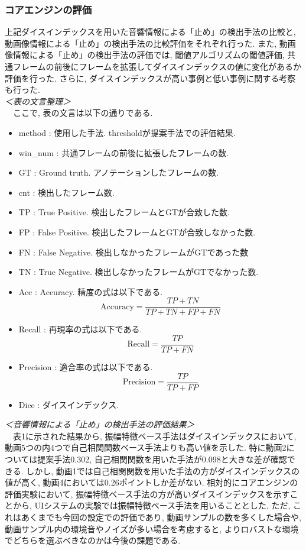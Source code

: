 \documentclass[paper]{ieicej}
\begin{document}
\subsubsection{コアエンジンの評価}
上記ダイスインデックスを用いた音響情報による「止め」の検出手法の比較と, 動画像情報による「止め」の検出手法の比較評価をそれぞれ行った. また, 動画像情報による「止め」の検出手法の評価では, 閾値アルゴリズムの閾値評価, 共通フレームの前後にフレームを拡張してダイスインデックスの値に変化があるか評価を行った. さらに, ダイスインデックスが高い事例と低い事例に関する考察も行った. \\
\textit{＜表の文言整理＞}\\
　ここで, 表の文言は以下の通りである. 
\begin{itemize}[nosep]
  \item method : 使用した手法. thresholdが提案手法での評価結果.
  \item win\_num : 共通フレームの前後に拡張したフレームの数. 
  \item GT : Ground truth. アノテーションしたフレームの数. 
  \item cnt : 検出したフレーム数. 
  \item TP : True Positive. 検出したフレームとGTが合致した数. 
  \item FP : False Positive. 検出したフレームとGTが合致しなかった数. 
  \item FN : False Negative. 検出しなかったフレームがGTであった数
  \item TN : True Negative. 検出しなかったフレームがGTでなかった数. 
  \item Acc : Accuracy. 精度の式は以下である. 
  \begin{equation}
    \text{Accuracy}=\frac{TP + TN}{TP+TN+FP+FN}
  \end{equation}
  \item Recall : 再現率の式は以下である.
  \begin{equation}
    \text{Recall}=\frac{TP}{TP+FN}
  \end{equation}
  \item Precision : 適合率の式は以下である.
  \begin{equation}
    \text{Precision}=\frac{TP}{TP+FP}
  \end{equation}
  \item Dice : ダイスインデックス.
\end{itemize}
\textit{＜音響情報による「止め」の検出手法の評価結果＞}\\
　表1に示された結果から, 振幅特徴ベース手法はダイスインデックスにおいて, 動画5つの内4つで自己相関関数ベース手法よりも高い値を示した. 特に動画2については提案手法0.302, 自己相関関数を用いた手法が0.098と大きな差が確認できる. しかし, 動画1では自己相関関数を用いた手法の方がダイスインデックスの値が高く, 動画4においては0.26ポイントしか差がない. 相対的にコアエンジンの評価実験において, 振幅特徴ベース手法の方が高いダイスインデックスを示すことから, UIシステムの実験では振幅特徴ベース手法を用いることとした. ただ, これはあくまでも今回の設定での評価であり, 動画サンプルの数を多くした場合や, 動画サンプル内の環境音やノイズが多い場合を考慮すると, よりロバストな環境でどちらを選ぶべきなのかは今後の課題である. \\
\end{document}
